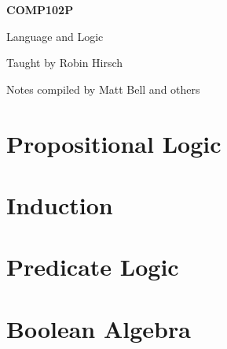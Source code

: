 \documentclass[12pt,a4paper]{report}
\begin{document}
    \begin{titlepage}
        \centering
        \bfseries
        \LARGE \textsc{COMP102P}\par
        \vspace{1cm}
        \Huge Language and Logic\par
        \vspace{1cm}
        \Large Taught by Robin Hirsch\par
        \vspace{1cm}
        \Large Notes compiled by Matt Bell and others
    \end{titlepage}

    \chapter{Propositional Logic}
    

    \chapter{Induction}
    

    \chapter{Predicate Logic}
    

    \chapter{Boolean Algebra}
    

    \glsaddall
    \clearpage
    \printglossaries
\end{document}
